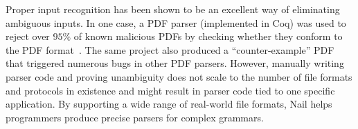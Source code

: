 


Proper input recognition has been shown to be an excellent way of
eliminating ambiguous inputs.  In one case, a PDF parser (implemented
in Coq) was used to reject over $95\%$ of known malicious PDFs by checking
whether they conform to the PDF format~\cite{Bogk-PDF}. The same project
also produced a ``counter-example'' PDF that triggered numerous bugs
in other PDF parsers. However, manually writing parser code and proving
unambiguity does not scale to the number of file formats and protocols
in existence and might result in parser code tied to one specific
application. By supporting a wide range of real-world file formats,
Nail helps programmers produce precise parsers for complex grammars.


